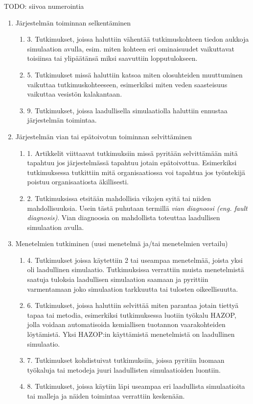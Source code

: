 \documentclass[utf8]{gradu3}
\begin{document}
TODO: siivoa numerointia
\begin{enumerate}
    \item Järjestelmän toiminnan selkentäminen
    \begin{enumerate}
        \item 3. Tutkimukset, joissa haluttiin vähentää tutkimuskohteen tiedon aukkoja simulaation avulla, esim. miten kohteen eri ominaisuudet vaikuttavat toisiinsa tai ylipäätänsä miksi saavuttiin lopputulokseen.
        \item 5. Tutkimukset missä haluttiin katsoa miten olosuhteiden muuttuminen vaikuttaa tutkimuskohteeseen, esimerkiksi miten veden saasteisuus vaikuttaa vesistön kalakantaan.
        \item 9. Tutkimukset, joissa laadullisella simulaatiolla haluttiin ennustaa järjestelmän toimintaa.
    \end{enumerate}
    \item Järjestelmän vian tai epätoivotun toiminnan selvittäminen
    \begin{enumerate}
        \item 1. Artikkelit viittaavat tutkimuksiin missä pyritään selvittämään mitä tapahtuu jos järjestelmässä tapahtuu jotain epätoivottua. Esimerkiksi tutkimuksessa \cite{hu2015cusp} tutkittiin mitä organisaatiossa voi tapahtua jos työntekijä poistuu organisaatiosta äkillisesti.
        \item 2. Tutkimuksissa etsitään mahdollisia vikojen syitä tai niiden mahdollisuuksia. Usein tästä puhutaan termillä \textit{ vian diagnoosi (eng. fault diagnosis)}. Vian diagnoosia on mahdollista toteuttaa laadullisen simulaation avulla.
    \end{enumerate}
    \item Menetelmien tutkiminen (uusi menetelmä ja/tai menetelmien vertailu)
    \begin{enumerate}
        \item 4. Tutkimukset joissa käytettiin 2 tai useampaa menetelmää, joista yksi oli laadullinen simulaatio. Tutkimuksissa verrattiin muista menetelmistä saatuja tuloksia laadullisen simulaation saamaan ja pyrittiin varmentamaan joko simulaation tarkkuutta tai tulosten oikeellisuutta.
        \item 6. Tutkimukset, joissa haluttiin selvittää miten parantaa jotain tiettyä tapaa tai metodia, esimerkiksi tutkimuksessa \textcite{zhang2015automatic} luotiin työkalu HAZOP, jolla voidaan automatisoida kemiallisen tuotannon vaarakohteiden löytämistä. Yksi HAZOP:in käyttämistä menetelmistä on laadullinen simulaatio.
        \item 7. Tutkimukset kohdistuivat tutkimuksiin, joissa pyritiin luomaan työkaluja tai metodeja juuri laadullisten simulaatioiden luontiin.
        \item 8. Tutkimukset, joissa käytiin läpi useampaa eri laadullista simulaatioita tai malleja ja näiden toimintaa verrattiin keskenään.
    \end{enumerate}
\end{enumerate}
\end{document}
